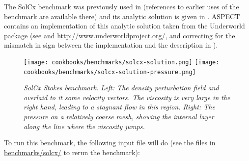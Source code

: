 \documentclass{article}
\newcommand{\aspect}{\textsc{ASPECT}}
\begin{document}
The SolCx benchmark was previously used in \cite[Section 4.1.1]{DMGT11}
(references to earlier uses of the benchmark are available there) and its analytic
solution is given in \cite{Zho96}. \aspect{} contains an implementation of
this analytic solution taken from the Underworld package (see \cite{MQLMAM07}
and \url{http://www.underworldproject.org/}, and correcting for the mismatch
in sign between the implementation and the description in \cite{DMGT11}).

\begin{figure}
  \begin{center}
    \texttt{[image: cookbooks/benchmarks/solcx-solution.png]}
    \hfill
    \texttt{[image: cookbooks/benchmarks/solcx-solution-pressure.png]}
    \caption{\it SolCx Stokes benchmark. Left: The density perturbation field
    and overlaid to it some velocity vectors. The viscosity is very large in the
      right hand, leading to a stagnant flow in this region. Right: The
      pressure on a relatively coarse mesh, showing the internal layer along
      the line where the viscosity jumps.}
    \label{fig:solcx}
  \end{center}
\end{figure}

To run this benchmark, the following input file will do (see the files in \url{benchmarks/solcx/} to rerun the benchmark):

\end{document}
